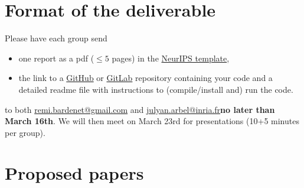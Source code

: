 \documentclass[12pt]{article}%
\begin{document}
\section{Format of the deliverable}
Please have each group send
\begin{itemize}
\item one report as a pdf ($\leq 5$ pages) in the \href{https://www.overleaf.com/latex/templates/neurips-2020/mnshsmqkjsqz}{NeurIPS template},
\item the link to a \href{https://github.com/}{GitHub} or \href{https://about.gitlab.com/}{GitLab} repository containing your code and a detailed readme file with instructions to (compile/install and) run the code.
\end{itemize} to both \href{mailto:remi.bardenet@gmail.com}{remi.bardenet@gmail.com} and \href{mailto: julyan.arbel@inria.fr}{ julyan.arbel@inria.fr}{\bf no later than March 16th}. 
We will then meet on March 23rd for presentations (10+5 minutes per group).

\section{Proposed papers}
\label{s:papers}



\end{document}
